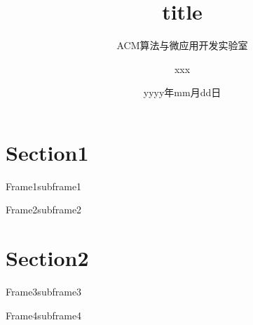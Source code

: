 \documentclass{pptt}
\title{title}
\author{ACM算法与微应用开发实验室 \and xxx}
\date{yyyy年mm月dd日}
\begin{document}
\maketitle

\section{Section1}

\begin{frame}{Frame1}{subframe1}
\end{frame}

\begin{frame}{Frame2}{subframe2}
\end{frame}

\section{Section2}

\begin{frame}{Frame3}{subframe3}
\end{frame}

\begin{frame}{Frame4}{subframe4}
\end{frame}
\end{document}

